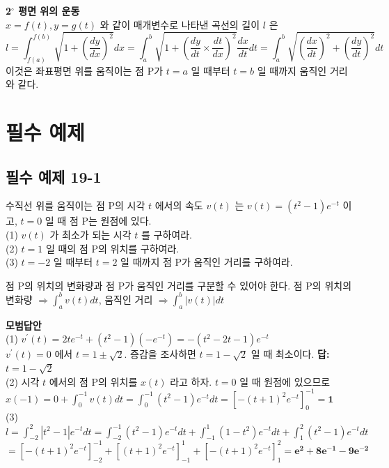 \documentclass[a4paper,11pt]{article}
\begin{document}
\begin{advicebox}
\textbf{2$^{\circ}$ 평면 위의 운동} \\
$x=f(t), y=g(t)$ 와 같이 매개변수로 나타낸 곡선의 길이 $l$ 은
\[ l = \int_{f(a)}^{f(b)} \sqrt{1 + (\dfrac{dy}{dx})^2} dx = \int_{a}^{b} \sqrt{1 + (\dfrac{dy}{dt} \times \dfrac{dt}{dx})^2} \dfrac{dx}{dt} dt = \int_{a}^{b} \sqrt{(\dfrac{dx}{dt})^2 + (\dfrac{dy}{dt})^2} dt \]
이것은 좌표평면 위를 움직이는 점 P가 $t=a$ 일 때부터 $t=b$ 일 때까지 움직인 거리와 같다.
\end{advicebox}

\newpage

\section*{필수 예제}

\subsection*{필수 예제 19-1}
수직선 위를 움직이는 점 P의 시각 $t$ 에서의 속도 $v(t)$ 는 $v(t)=(t^2-1)e^{-t}$ 이고, $t=0$ 일 때 점 P는 원점에 있다.\\
(1) $v(t)$ 가 최소가 되는 시각 $t$ 를 구하여라.\\
(2) $t=1$ 일 때의 점 P의 위치를 구하여라.\\
(3) $t=-2$ 일 때부터 $t=2$ 일 때까지 점 P가 움직인 거리를 구하여라.

\begin{studybox}
점 P의 위치의 변화량과 점 P가 움직인 거리를 구분할 수 있어야 한다.
점 P의 위치의 변화량 $\Rightarrow \int_{a}^{b} v(t) dt$, 움직인 거리 $\Rightarrow \int_{a}^{b} |v(t)| dt$
\end{studybox}

\textbf{모범답안} \\
(1) $v^{\prime}(t)=2te^{-t}+(t^2-1)(-e^{-t})=-(t^2-2t-1)e^{-t}$ \\
$v^{\prime}(t)=0$ 에서 $t=1\pm\sqrt{2}$. 증감을 조사하면 $t=1-\sqrt{2}$ 일 때 최소이다. \textbf{답: $t=1-\sqrt{2}$} \\
(2) 시각 $t$ 에서의 점 P의 위치를 $x(t)$ 라고 하자. $t=0$ 일 때 원점에 있으므로
$x(-1) = 0 + \int_{0}^{-1} v(t) dt = \int_{0}^{-1} (t^2-1)e^{-t} dt = [-(t+1)^2 e^{-t}]_0^{-1} = \mathbf{1}$ \\
(3) $l = \int_{-2}^{2} |t^2-1|e^{-t} dt = \int_{-2}^{-1} (t^2-1)e^{-t} dt + \int_{-1}^{1} (1-t^2)e^{-t} dt + \int_{1}^{2} (t^2-1)e^{-t} dt$ \\
$= [-(t+1)^2 e^{-t}]_{-2}^{-1} + [(t+1)^2 e^{-t}]_{-1}^{1} + [-(t+1)^2 e^{-t}]_{1}^{2} = \mathbf{e^2 + 8e^{-1} - 9e^{-2}}$
\end{document}
